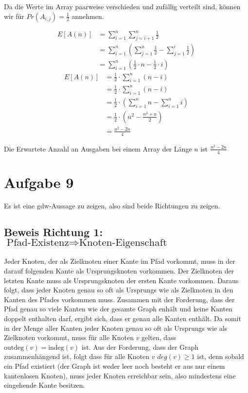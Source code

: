 \documentclass[parskip=half,a4paper]{scrartcl}
\begin{document}
Da die Werte im Array paarweise verschieden und zufällig verteilt sind, können wir für $Pr(A_{i,j}) = \frac{1}{2}$ annehmen.


\begin{equation}
\begin{aligned}
   E\left[A(n)\right] &= \sum_{i=1}^{n}{\sum_{j=i+1}^{n}{\frac{1}{2}}}\\
   &= \sum_{i=1}^{n}{\left(\sum_{j=1}^{n}{\frac{1}{2}} - \sum_{j=1}^{i}{\frac{1}{2}}\right)}\\
   &= \sum_{i=1}^{n}{\left(\frac{1}{2}\cdot n - \frac{1}{2}\cdot i\right)}
\end{aligned}
\end{equation}
\begin{equation}
\begin{aligned}
   E\left[A(n)\right] &= \frac{1}{2} \cdot \sum_{i=1}^{n}{\left(n - i\right)}\\
   &= \frac{1}{2} \cdot \sum_{i=1}^{n}{\left(n - i\right)}\\
   &= \frac{1}{2} \cdot \left(\sum_{i=1}^{n}{n} - \sum_{i=1}^{n}{i}\right)\\
   &= \frac{1}{2} \cdot \left(n^2 - \frac{n^2 + n}{2}\right)\\
   &= \frac{n^2 - 2n}{4}
\end{aligned}
\end{equation}

Die Erwartete Anzahl an Ausgaben bei einem Array der Länge $n$ ist $\frac{n^2 - 2n}{4}$

\section*{Aufgabe 9}

Es ist eine gdw-Aussage zu zeigen, also sind beide Richtungen zu zeigen.

\subsection*{Beweis Richtung 1: $\text{Pfad-Existenz} \Rightarrow \text{Knoten-Eigenschaft}$}

Jeder Knoten, der als Zielknoten einer Kante im Pfad vorkommt, muss in der darauf folgenden Kante als Ursprungsknoten vorkommen. Der Zielknoten der letzten Kante muss als Ursprungsknoten der ersten Kante vorkommen. Daraus folgt, dass jeder Knoten genau so oft als Ursprungs wie als Zielknoten in den Kanten des Pfades vorkommen muss. Zusammen mit der Forderung, dass der Pfad genau so viele Kanten wie der gesamte Graph enhält und keine Kanten doppelt enthalten darf, ergibt sich, dass er genau alle Kanten enthält. Da somit in der Menge aller Kanten jeder Knoten genau so oft als Ursprungs wie als Zielknoten vorkommt, muss für alle Knoten $v$ gelten, dass $\text{outdeg}(v) = \text{indeg}(v)$ ist. Aus der Forderung, dass der Graph zusammenhängend ist, folgt dass für alle Knoten $v$ $deg(v) \ge 1$ ist, denn sobald ein Pfad existiert (der Graph ist weder leer noch besteht er aus nur einem kantenlosen Knoten), muss jeder Knoten erreichbar sein, also mindestens eine eingehende Kante besitzen.
\end{document}
